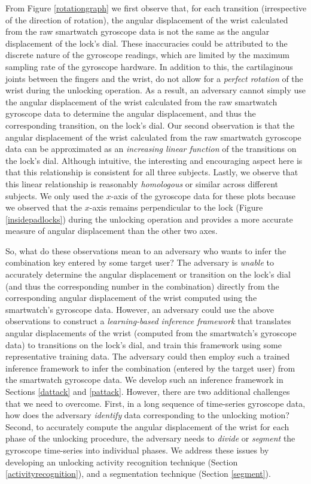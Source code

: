 \documentclass[]{IEEEtran}
\begin{document}
From Figure \ref{rotationgraph} we first observe that, for each transition (irrespective of the direction of rotation), the angular displacement of the wrist calculated from the raw smartwatch gyroscope data is not the same as the angular displacement of the lock's dial. These inaccuracies could be attributed to the discrete nature of the gyroscope readings, which are limited by the maximum sampling rate of the gyroscope hardware. In addition to this, the cartilaginous joints between the fingers and the wrist, do not allow for a \emph{perfect rotation} of the wrist during the unlocking operation. As a result, an adversary cannot simply use the angular displacement of the wrist calculated from the raw smartwatch gyroscope data to determine the angular displacement, and thus the corresponding transition, on the lock's dial. Our second observation is that the angular displacement of the wrist calculated from the raw smartwatch gyroscope data can be approximated as an \emph{increasing linear function} of the transitions on the lock's dial. Although intuitive, the interesting and encouraging aspect here is that this relationship is consistent for all three subjects. Lastly, we observe that this linear relationship is reasonably \emph{homologous} or similar across different subjects. 
We only used the $x$-axis of the gyroscope data for these plots because we observed that the $x$-axis remains perpendicular to the lock (Figure \ref{insidepadlocks}) during the unlocking operation and provides a more accurate measure of angular displacement than the other two axes.

So, what do these observations mean to an adversary who wants to infer the combination key entered by some target user? The adversary is \emph{unable} to accurately determine the angular displacement or transition on the lock's dial (and thus the corresponding number in the combination) directly from the corresponding angular displacement of the wrist computed using the smartwatch's gyroscope data. However, an adversary could use the above observations to construct a \emph{learning-based inference framework} that translates angular displacements of the wrist (computed from the smartwatch's gyroscope data) to transitions on the lock's dial, and train this framework using some representative training data. The adversary could then employ such a trained inference framework to infer the combination (entered by the target user) from the smartwatch gyroscope data. We develop such an inference framework in Sections \ref{dattack} and \ref{pattack}. However, there are two additional challenges that we need to overcome. First, in a long sequence of time-series gyroscope data, how does the adversary \emph{identify} data corresponding to the unlocking motion? Second, to accurately compute the angular displacement of the wrist for each phase of the unlocking procedure, the adversary needs to \emph{divide} or \emph{segment} the gyroscope time-series into individual phases. We address these issues by developing an unlocking activity recognition technique (Section \ref{activityrecognition}), and a segmentation technique (Section \ref{segment}).
\end{document}
